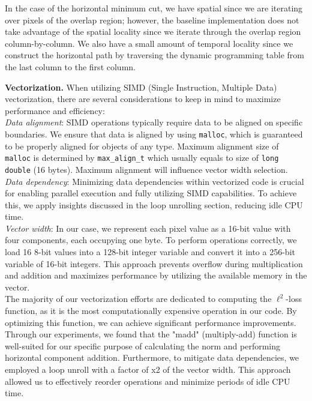 \documentclass[letterpaper]{article}
\newcommand{\mypar}[1]{{\bf #1.}}
\begin{document}
In the case of the horizontal minimum cut, we have spatial since we are iterating over pixels of the overlap region; however, the baseline implementation does not take advantage of the spatial locality since we iterate through the overlap region column-by-column. We also have a small amount of temporal locality since we construct the horizontal path by traversing the dynamic programming table from the last column to the first column.

\mypar{Vectorization} When utilizing SIMD (Single Instruction, Multiple Data) vectorization, there are several considerations to keep in mind to maximize performance and efficiency: \\ 
\textit{Data alignment}: SIMD operations typically require data to be aligned on specific boundaries. We ensure that data is aligned by using \texttt{malloc}, which is guaranteed to be properly aligned for objects of any type. Maximum alignment size of \texttt{malloc} is determined by \texttt{max\_align\_t} which usually equals to size of \texttt{long double} (16 bytes). Maximum alignment will influence vector width selection.  \\
\textit{Data dependency}: Minimizing data dependencies within vectorized code is crucial for enabling parallel execution and fully utilizing SIMD capabilities. To achieve this, we apply insights discussed in the loop unrolling section, reducing idle CPU time. \\
\textit{Vector width}: In our case, we represent each pixel value as a 16-bit value with four components, each occupying one byte. To perform operations correctly, we load 16 8-bit values into a 128-bit integer variable and convert it into a 256-bit variable of 16-bit integers. This approach prevents overflow during multiplication and addition and maximizes performance by utilizing the available memory in the vector.\\
The majority of our vectorization efforts are dedicated to computing the $\ell^2$-loss function, as it is the most computationally expensive operation in our code. By optimizing this function, we can achieve significant performance improvements. \\
Through our experiments, we found that the "madd" (multiply-add) function is well-suited for our specific purpose of calculating the norm and performing horizontal component addition.
Furthermore, to mitigate data dependencies, we employed a loop unroll with a factor of x2 of the vector width. This approach allowed us to effectively reorder operations and minimize periods of idle CPU time. 
\end{document}
